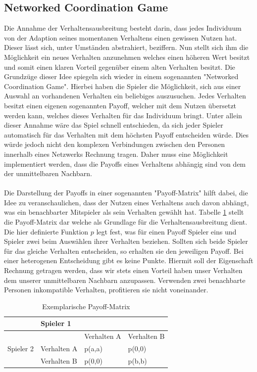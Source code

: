 \documentclass[12pt]{article}
\begin{document}
\subsection{Networked Coordination Game}
Die Annahme der Verhaltensausbreitung besteht darin, dass jedes Individuum von der Adaption seines momentanen Verhaltens einen gewissen Nutzen hat. Dieser lässt sich, unter Umständen abstrahiert, beziffern. Nun stellt sich ihm die Möglichkeit ein neues Verhalten anzunehmen welches einen höheren Wert besitzt und somit einen klaren Vorteil gegenüber einem alten Verhalten besitzt. Die Grundzüge dieser Idee spiegeln sich wieder in einem sogenannten "Networked Coordination Game". Hierbei haben die Spieler die Möglichkeit, sich aus einer Auswahl an vorhandenen Verhalten ein beliebiges auszusuchen. Jedes Verhalten besitzt einen eigenen sogenannten Payoff, welcher mit dem Nutzen übersetzt werden kann, welches dieses Verhalten für das Individuum bringt. Unter allein dieser Annahme wäre das Spiel schnell entschieden, da sich jeder Spieler automatisch für das Verhalten mit dem höchsten Payoff entscheiden würde. Dies würde jedoch nicht den komplexen Verbindungen zwischen den Personen innerhalb eines Netzwerks Rechnung tragen. Daher muss eine Möglichkeit implementiert werden, dass die Payoffs eines Verhaltens abhängig sind von dem der unmittelbaren Nachbarn.\\\\ Die Darstellung der Payoffs in einer sogenannten "Payoff-Matrix" hilft dabei, die Idee zu veranschaulichen, dass der Nutzen eines Verhaltens auch davon abhängt, was ein benachbarter Mitspieler als sein Verhalten gewählt hat. Tabelle \ref{my-label} stellt die Payoff-Matrix dar welche als Grundlage für die Verhaltensausbreitung dient. Die hier definierte Funktion $p$ legt fest, was für einen Payoff Spieler eins und Spieler zwei beim Auswählen ihrer Verhalten beziehen. Sollten sich beide Spieler für das gleiche Verhalten entscheiden, so erhalten sie den jeweiligen Payoff. Bei einer heterogenen Entscheidung gibt es keine Punkte. Hiermit soll der Eigenschaft Rechnung getragen werden, dass wir stets einen Vorteil haben unser Verhalten dem unserer unmittelbaren Nachbarn anzupassen. Verwenden zwei benachbarte Personen inkompatible Verhalten, profitieren sie nicht voneinander.
\begin{table}[h]
\centering
\caption{Exemplarische Payoff-Matrix}
\label{my-label}
\begin{tabular}{|l|l|l|l|}
\hline
                           & \multicolumn{3}{l|}{Spieler 1}          \\ \hline
\multirow{3}{*}{Spieler 2} &             & Verhalten A & Verhalten B \\ \cline{2-4} 
                           & Verhalten A & p(a,a)      & p(0,0)      \\ \cline{2-4} 
                           & Verhalten B & p(0,0)      & p(b,b)      \\ \hline
\end{tabular}
\end{table}
\end{document}
